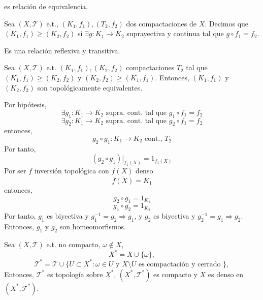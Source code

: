 \begin{obs}
  es relación de equivalencia.
\end{obs}

\begin{defn}
  Sea $( X, \mathcal{T} )$ e.t., $( K_{1}, f_{1} ), ( T_{2}, f_{2} )$ dos compactaciones de $X$. Decimos que $( K_{1}, f_{1} ) \geq ( K_{2}, f_{2} )$ si $\exists g : K_{1} \to K_{2}$ suprayectiva y continua tal que $g \circ f_{1} = f_{2}$. 
\end{defn}

\begin{obs}
  Es una relación reflexiva y transitiva.
\end{obs}

\begin{prop}
  Sea $( X, \mathcal{T} )$ e.t. $( K_{1}, f_{1} ), ( K_{2}, f_{2} )$ compactaciones $T_{2}$ tal que $( K_{1}, f_{1} ) \geq ( K_{2}, f_{2} )$ y $( K_{2}, f_{2} ) \geq ( K_{1}, f_{1} )$. Entonces, $( K_{1}, f_{1} )$ y $( K_{2}, f_{2} )$ son topológicamente equivalentes.
\end{prop}

\begin{dem}
  Por hipótesis,
  \[ 
    \exists g_{1} : K_{1} \to K_{2} \text{ supra. cont. tal que } g_{1} \circ f_{1} = f_{2}
  \] 
  \[ 
    \exists g_{2} : K_{1} \to K_{2} \text{ supra. cont. tal que } g_{2} \circ f_{1} = f_{2}
  \] 
  entonces,
  \[ 
    g_{2} \circ g_{1} : K_{1} \to K_{2} \text{ cont., } T_{2}  
  \] 
  Por tanto,
  \[ 
    (g_{2} \circ g_{1})|_{f_{1}(X)} = 1_{f_{1}(X)} 
  \] 
  Por ser $f$ inversión topológica con $f(X)$ denso
  \[ 
    \overline{f(X)} = K_{1} 
  \] 
  entonces,
  \[ 
    g_{2} \circ g_{1} = 1_{K_{1}} 
  \] 
  \[ 
    g_{1} \circ g_{2} = 1_{K_{2}} 
  \] 
  Por tanto, $g_{1}$ es biyectiva y $g_{1}^{-1} = g_{2} \Rightarrow g_{1}$, y $g_{2}$ es biyectiva y $g_{2}^{-1} = g_{1} \Rightarrow g_{2}$. Entonces, $g_{1}$ y $g_{2}$ son homeomorfismos.
\end{dem}

\begin{theo}[Alessandroff]
  Sea $( X, \mathcal{T} )$ e.t. no compacto, $\omega \not \in X$,
  \[
    X^* = X \cup \{ \omega \},
  \]
  \[
    \mathcal{T}^* = \mathcal{T} \cup \{ U \subset X^* : \omega \in U \text{ y } X \setminus U \text{ es compactación y cerrado } \},
  \]
  Entonces, $\mathcal{T}^*$ es topología sobre $ X^*$, $( X^*, \mathcal{T}^* )$ es compacto y $X$ es denso en $( X^*, \mathcal{T}^* )$.
\end{theo}

